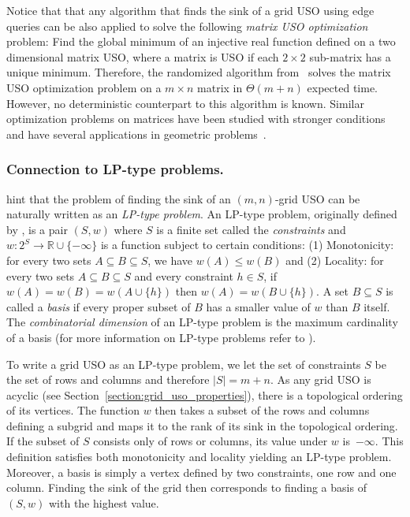 \documentclass[runningheads,a4paper]{llncs}
\begin{document}
Notice that that any algorithm that finds the sink of a grid USO using edge queries can be also applied to solve the following \emph{matrix USO optimization} problem: Find the global minimum of an injective real function defined on a two dimensional matrix USO, where a matrix is USO if each $2\times 2$ sub-matrix has a unique minimum. 
Therefore, the randomized algorithm from~\citet{grid08} solves the matrix USO optimization problem on a $m\times n$ matrix in $\Theta(m+n)$ expected time. However, no deterministic counterpart to this algorithm is known. 
Similar optimization problems on matrices have been studied with stronger conditions and have several applications in geometric problems~\cite{aggarwal1987geometric,demaine2005optimizing,galil1992dynamic,mityagin2003complexity}.

\subsubsection{Connection to LP-type problems.} \citet{grid08} hint that the problem of finding the sink of an $(m,n)$-grid USO can be naturally written as an \emph{LP-type problem}. An LP-type problem, originally defined by \citet{SharirW92}, is a pair $(S,w)$ where $S$ is a finite set called the \emph{constraints} and
$w:2^S \rightarrow \mathbb{R} \cup \{-\infty\}$ is a function subject to certain conditions: 
(1) Monotonicity: for every two sets $A \subseteq B \subseteq S$, we have $w(A) \leq w(B) $ and
(2) Locality: for every two sets $A \subseteq B \subseteq S$ and every constraint $h \in S$, if $w(A) = w(B) = w(A\cup \{h\})$ then $w(A) = w(B \cup \{h\})$.
A set $B \subseteq S$ is called a \emph{basis} if every proper subset
of $B$ has a smaller value of $w$ than $B$ itself. The \emph{combinatorial dimension} of an LP-type problem 
is the maximum cardinality of a basis
(for more information on LP-type problems refer to \cite{MatousekSW96}). 

To write a grid USO as an LP-type problem, we let the set of constraints $S$ be the set of rows and columns and therefore $|S| = m + n$. As any grid USO is acyclic (see Section~\ref{section:grid_uso_properties}), there is a topological ordering of its vertices. 
The function $w$ then takes a subset of the rows and columns defining a subgrid and maps it to the rank of its sink in the topological ordering. 
If the subset of $S$ consists only of rows or columns, its value under $w$ is~$-\infty$. 
This definition satisfies both monotonicity and locality yielding an LP-type problem.
Moreover, a basis is simply a vertex defined by two constraints, one row and one column.
Finding the sink of the grid then corresponds to finding a basis of $(S,w)$ with the highest value.
\end{document}
